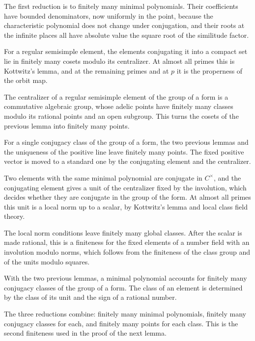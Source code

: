The first reduction is to finitely many minimal polynomials. Their coefficients have bounded
denominators, now uniformly in the point, because the characteristic polynomial does not change under
conjugation, and their roots at the infinite places all have absolute value the square root of the
similitude factor.

For a regular semisimple element, the elements conjugating it into a compact set lie in finitely many
cosets modulo its centralizer. At almost all primes this is Kottwitz's lemma, and at the remaining primes
and at $p$ it is the properness of the orbit map.

The centralizer of a regular semisimple element of the group of a form is a commutative algebraic group,
whose adelic points have finitely many classes modulo its rational points and an open subgroup. This turns the cosets of the
previous lemma into finitely many points.

For a single conjugacy class of the group of a form, the two previous lemmas and the uniqueness of the
positive line leave finitely many points. The fixed positive vector is moved to a standard one by the
conjugating element and the centralizer.

Two elements with the same minimal polynomial are conjugate in $C^\times$, and the conjugating element
gives a unit of the centralizer fixed by the involution, which decides whether they are conjugate in the
group of the form. At almost all primes this unit is a local norm up to a scalar, by Kottwitz's lemma and
local class field theory.

The local norm conditions leave finitely many global classes. After the scalar is made rational, this is
a finiteness for the fixed elements of a number field with an involution modulo norms, which follows from
the finiteness of the class group and of the units modulo squares.

With the two previous lemmas, a minimal polynomial accounts for finitely many conjugacy classes of the
group of a form. The class of an element is determined by the class of its unit and the sign of a
rational number.

The three reductions combine: finitely many minimal polynomials, finitely many conjugacy classes for each,
and finitely many points for each class. This is the second finiteness used in the proof of the next
lemma.

